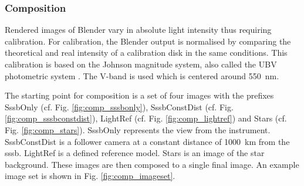 \subsubsection{Composition} \label{sec:composition}
Rendered images of Blender vary in absolute light intensity thus requiring calibration. For calibration, the Blender output is normalised by comparing the theoretical and real intensity of a calibration disk in the same conditions. This calibration is based on the Johnson magnitude system, also called the UBV photometric system \cite{bessel1979ubvri}. The V-band is used which is centered around \SI{550}{\nano\meter}.

The starting point for composition is a set of four images with the prefixes SssbOnly (cf. Fig. \ref{fig:comp_sssbonly}), SssbConstDist (cf. Fig. \ref{fig:comp_sssbconstdist}), LightRef (cf. Fig. \ref{fig:comp_lightref}) and Stars (cf. Fig. \ref{fig:comp_stars}). SssbOnly represents the view from the instrument. SssbConstDist is a follower camera at a constant distance of \SI{1000}{\kilo\meter} from the \gls{sssb}. LightRef is a defined reference model. Stars is an image of the star background. These images are then composed to a single final image. An example image set is shown in Fig. \ref{fig:comp_imageset}.

